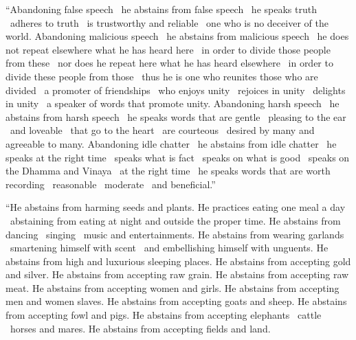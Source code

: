 \begin{justify}
  “Abandoning false speech \breathmark\ he abstains from false speech \breathmark\ he speaks truth \breathmark\ adheres to truth \breathmark\ is trustworthy and reliable \breathmark\ one who is no deceiver of the world. Abandoning malicious speech \breathmark\ he abstains from malicious speech \breathmark\ he does not repeat elsewhere what he has heard here \breathmark\ in order to divide those people
  from these \breathmark\ nor does he repeat here what he has heard elsewhere \breathmark\ in order to divide these people from those \breathmark\ thus he is one who reunites those who are divided \breathmark\ a promoter of friendships \breathmark\ who enjoys unity \breathmark\ rejoices in unity \breathmark\ delights in unity \breathmark\ a speaker of words that promote unity. Abandoning harsh speech \breathmark\ he abstains from harsh speech \breathmark\ he speaks words that are gentle \breathmark\ pleasing to the ear \breathmark\ and loveable \breathmark\ that go to the heart \breathmark\ are courteous \breathmark\ desired by many and agreeable to many. Abandoning idle chatter \breathmark\ he abstains from idle chatter \breathmark\ he speaks at the right time \breathmark\ speaks what is fact \breathmark\ speaks on what is good \breathmark\ speaks on the Dhamma and Vinaya \breathmark\ at the right time \breathmark\ he speaks words that are worth recording \breathmark\ reasonable \breathmark\ moderate \breathmark\ and beneficial.”
\end{justify}

\begin{justify}
  “He abstains from harming seeds and plants. He practices eating one meal a day \breathmark\ abstaining from eating at night and outside the proper time. He abstains from dancing \breathmark\ singing \breathmark\ music and entertainments. He abstains from wearing garlands \breathmark\ smartening himself with scent \breathmark\ and embellishing himself with unguents. He abstains from high and luxurious sleeping places. He abstains from accepting gold and silver. He abstains from accepting raw grain. He abstains from accepting raw meat. He abstains from accepting women and girls. He abstains from accepting men and women slaves. He abstains from accepting goats and sheep. He abstains from accepting fowl and pigs. He abstains from accepting elephants \breathmark\ cattle \breathmark\ horses and mares. He abstains from accepting fields and land.
\end{justify}

